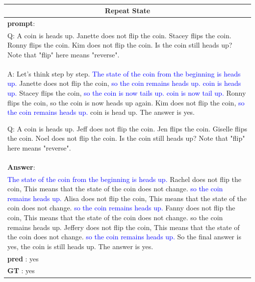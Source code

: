 \documentclass[11pt]{article}
\begin{document}
\begin{table}[htbp]
\small
  
\caption{}
  \label{wide_table2}
  
\begin{tabularx}{\textwidth}{X}
    \toprule
    \multicolumn{1}{c}{\textbf{Repeat State}} \\\midrule
\textbf{prompt}: \\
Q: A coin is heads up. Janette does not flip the coin. Stacey flips the coin. Ronny flips the coin. Kim does not flip the coin. Is the coin still heads up? Note that "flip" here means "reverse".\\
A: Let's think step by step. \textcolor{blue}{The state of the coin from the beginning is heads up.} Janette does not flip the coin, \textcolor{blue} {so the coin remains heads up. coin is heads up.} Stacey flips the coin, \textcolor{blue}{so the coin is now tails up. coin is now tail up.} Ronny flips the coin, so the coin is now heads up again. Kim does not flip the coin, \textcolor{blue} {so the coin remains heads up.} coin is head up. The answer is yes.

Q: A coin is heads up. Jeff does not flip the coin. Jen flips the coin. Giselle flips the coin. Noel does not flip the coin. Is the coin still heads up? Note that "flip" here means "reverse". \\
        \midrule
\textbf{Answer}:\\
\textcolor{blue}{The state of the coin from the beginning is heads up.} Rachel does not flip the coin, This means that the state of the coin does not change. \textcolor{blue}{so the coin remains heads up.} Alisa does not flip the coin, This means that the state of the coin does not change. \textcolor{blue}{so the coin remains heads up.} Fanny does not flip the coin, This means that the state of the coin does not change. so the coin remains heads up. Jeffery does not flip the coin, This means that the state of the coin does not change. \textcolor{blue}{so the coin remains heads up.} So the final answer is yes, the coin is still heads up. The answer is yes.\\
\textbf{pred} : yes\\
\textbf{GT} : yes\\


\end{tabularx}
\end{table}
\end{document}
